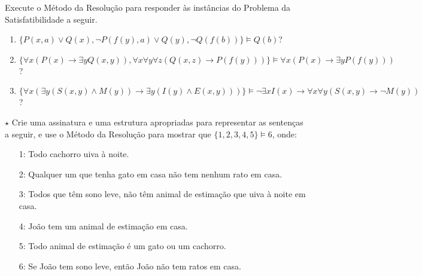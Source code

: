 \begin{exercises}
    \begin{question}
        Execute o Método da Resolução para responder às instâncias do Problema da Satisfatibilidade a seguir.
        \begin{enumerate}
            \item $\{P(x, a) \lor Q(x), \neg P(f(y), a) \lor Q(y), \neg Q(f(b))\} \vDash Q(b)$?
            \item $\{\forall x(P(x) \rightarrow \exists yQ(x, y)), \forall x\forall y \forall z(Q(x, z) \rightarrow P(f(y)))\} \vDash \forall x(P(x) \rightarrow \exists yP(f(y)))$?
            \item $\{\forall x(\exists y(S(x, y) \land M(y)) \rightarrow \exists y(I(y) \land E(x,y)))\} \vDash \neg\exists xI(x) \rightarrow \forall x\forall y(S(x, y) \rightarrow \neg M(y))$?
        \end{enumerate}
    \end{question}

    \begin{question}
        $\star$ Crie uma assinatura e uma estrutura apropriadas para representar as sentenças a seguir, e use o Método da Resolução para mostrar que $\{1, 2, 3, 4, 5\} \vDash 6$, onde:
        \begin{enumerate}
            \item [1:] Todo cachorro uiva à noite.
            \item [2:] Qualquer um que tenha gato em casa não tem nenhum rato em casa.
            \item [3:] Todos que têm sono leve, não têm animal de estimação que uiva à noite em casa.
            \item [4:] João tem um animal de estimação em casa.
            \item [5:] Todo animal de estimação é um gato ou um cachorro.
            \item [6:] Se João tem sono leve, então João não tem ratos em casa.
        \end{enumerate}
    \end{question}
\end{exercises}